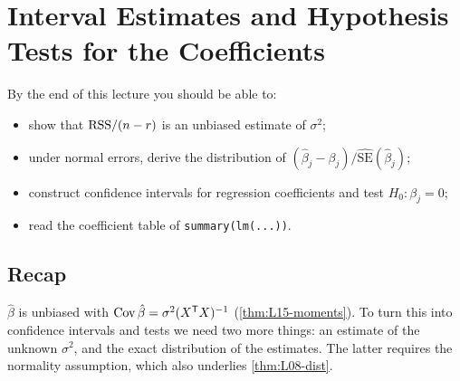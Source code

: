\section{Interval Estimates and Hypothesis Tests for the Coefficients}\label{sec:L16}


\begin{guiding*}
By the end of this lecture you should be able to:
\begin{itemize}
  \item show that $\mathrm{RSS}/(n-r)$ is an unbiased estimate of $\sigma^2$;
  \item under normal errors, derive the distribution of $(\hat\beta_j-\beta_j)/\widehat{\mathrm{SE}}(\hat\beta_j)$;
  \item construct confidence intervals for regression coefficients and test $H_0:\beta_j=0$;
  \item read the coefficient table of \texttt{summary(lm(...))}.
\end{itemize}
\end{guiding*}

\subsection{Recap}
$\hat\beta$ is unbiased with $\operatorname{Cov}\hat\beta=\sigma^2(X^{\mathsf T} X)^{-1}$ (\cref{thm:L15-moments}). To turn this into
confidence intervals and tests we need two more things: an estimate of the unknown $\sigma^2$, and the
exact distribution of the estimates. The latter requires the normality assumption, which also
underlies \cref{thm:L08-dist}.

